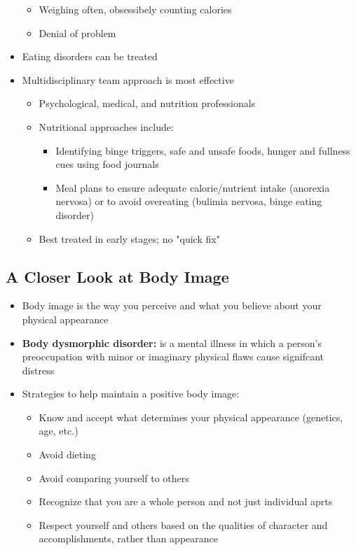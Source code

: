 \documentclass[12pt]{article}
\begin{document}
\begin{itemize}
\begin{itemize}
                        \item Weighing often, obsessibely counting calories
                        \item Denial of problem
                    \end{itemize}
                \item Eating disorders can be treated
                \item Multidisciplinary team approach is most effective
                    \begin{itemize}
                        \item Psychological, medical, and nutrition professionals
                        \item Nutritional approaches include:
                            \begin{itemize}
                                \item Identifying binge triggers, safe and unsafe foods, hunger and fullness cues using food journals
                                \item Meal plans to ensure adequate calorie/nutrient intake (anorexia nervosa) or to avoid overeating (bulimia nervosa, binge eating disorder)
                            \end{itemize}
                        \item Best treated in early stages; no "quick fix"
                    \end{itemize}
            \end{itemize}

        \subsection{A Closer Look at Body Image}
            \begin{itemize}
                \item Body image is the way you perceive and what you believe about your physical appearance
                \item \textbf{Body dysmorphic disorder:} is a mental illness in which a person's preoccupation with minor or imaginary physical flaws cause signifcant distress
                \item Strategies to help maintain a positive body image:
                    \begin{itemize}
                        \item Know and accept what determines your physical appearance (genetics, age, etc.)
                        \item Avoid dieting
                        \item Avoid comparing yourself to others
                        \item Recognize that you are a whole person and not just individual aprts
                        \item Respect yourself and others based on the qualities of character and accomplishments, rather than appearance
                    \end{itemize}
            \end{itemize}
\end{document}
